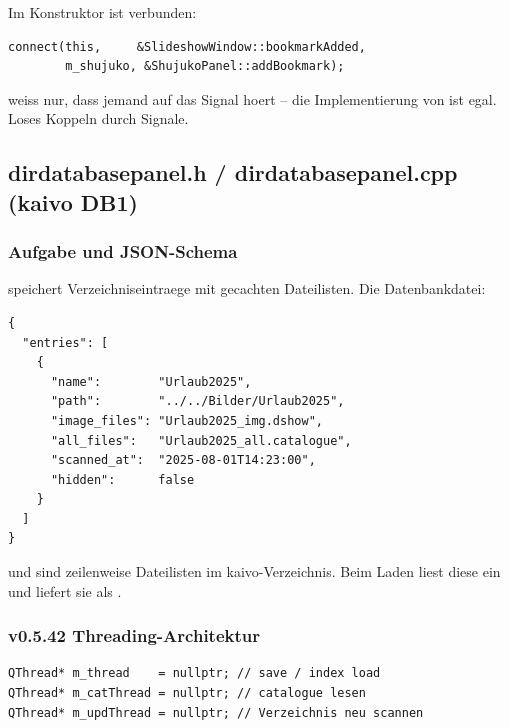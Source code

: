 Im Konstruktor ist verbunden:
\begin{lstlisting}
connect(this,     &SlideshowWindow::bookmarkAdded,
        m_shujuko, &ShujukoPanel::addBookmark);
\end{lstlisting}

 weiss nur, dass jemand auf das
Signal hoert -- die Implementierung von
 ist egal. Loses Koppeln durch
Signale.

\subsection{dirdatabasepanel.h / dirdatabasepanel.cpp (kaivo DB1)}

\subsubsection{Aufgabe und JSON-Schema}

 speichert Verzeichniseintraege
mit gecachten Dateilisten. Die Datenbankdatei:

\begin{lstlisting}[language={},numbers=none,
  caption={tilvista\_dirs.json -- Struktur}]
{
  "entries": [
    {
      "name":        "Urlaub2025",
      "path":        "../../Bilder/Urlaub2025",
      "image_files": "Urlaub2025_img.dshow",
      "all_files":   "Urlaub2025_all.catalogue",
      "scanned_at":  "2025-08-01T14:23:00",
      "hidden":      false
    }
  ]
}
\end{lstlisting}

 und  sind
zeilenweise Dateilisten im kaivo-Verzeichnis.
Beim Laden liest  diese
ein und liefert sie als .

\subsubsection{v0.5.42 Threading-Architektur}

\begin{lstlisting}[style=header,
  caption={Drei Thread-Pointer in DirDatabasePanel}]
QThread* m_thread    = nullptr; // save / index load
QThread* m_catThread = nullptr; // catalogue lesen
QThread* m_updThread = nullptr; // Verzeichnis neu scannen
\end{lstlisting}

